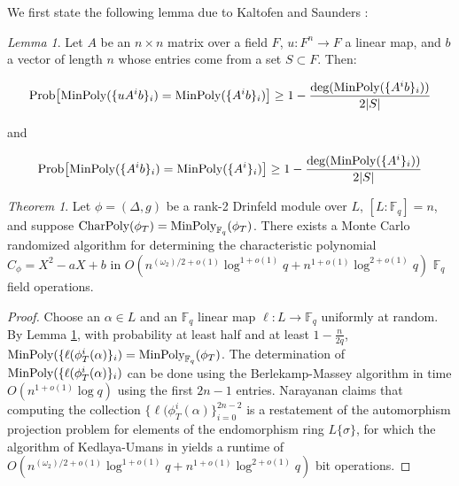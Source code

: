 \documentclass{jams-l}
\theoremstyle{remark}
\numberwithin{equation}{section}
\newtheorem{theorem}{Theorem}
\newtheorem{lemma}{Lemma}
\newcommand{\minpol}{\textnormal{MinPoly}_{\mathbb{F}_q}}
\begin{document}
We first state the following lemma due to Kaltofen and Saunders \cite{Kaltofen-saun:1991:WMS:646027.676885} :

\begin{lemma}\label{kalsaun}
Let $A$ be an $n\times n$ matrix over a field $F$, $u: F^n \to F$ a linear map, and $b$ a vector of length $n$ whose entries come from a set $S \subset F$. Then:

\[ \textnormal{Prob}\big[\textnormal{MinPoly}(\{uA^ib\}_i) = \textnormal{MinPoly}(\{A^ib\}_i)\big] \geq 1 - \frac{\textnormal{deg}(\textnormal{MinPoly}(\{A^ib\}_i))}{2|S|} \]

\noindent and

\[ \textnormal{Prob}\big[\textnormal{MinPoly}(\{A^ib\}_i) = \textnormal{MinPoly}(\{A^i\}_i)\big] \geq 1 - \frac{\textnormal{deg}(\textnormal{MinPoly}(\{A^i\}_i))}{2|S|} \]



\end{lemma}


\begin{theorem}
Let $\phi = (\Delta, g)$ be a rank-2 Drinfeld module over $L$, $[L: \mathbb{F}_q] = n$, and suppose $\textnormal{CharPoly}(\phi_T) = \minpol(\phi_T)$. There exists a Monte Carlo randomized algorithm for determining the characteristic polynomial $C_{\phi} = X^2 -aX + b$ in $O(n^{(\omega_2)/2 + o(1)}\log^{1+o(1)}q + n^{1+o(1)}\log^{2+o(1)}q)$ $\mathbb{F}_q$ field operations.
\end{theorem}

\begin{proof}

Choose an $\alpha \in L$ and an $\mathbb{F}_q$ linear map $\ell: L \to \mathbb{F}_q$ uniformly at random. By Lemma \ref{kalsaun}, with probability at least half and at least $1 - \frac{n}{2q}$, $\textnormal{MinPoly}(\{\ell(\phi_T^i(\alpha)\}_i) = \minpol(\phi_T)$. The determination of $\textnormal{MinPoly}(\{\ell(\phi_T^i(\alpha)\}_i)$ can be done using the Berlekamp-Massey algorithm in time $O(n^{1+ o(1)} \log q)$ using the first $2n - 1$ entries. Narayanan claims that computing the collection $\{ \ell(\phi_T^i(\alpha)\}_{i=0}^{2n-2}$ is a restatement of the automorphism projection problem for elements of the endomorphism ring $L\{\sigma\}$, for which the algorithm of Kedlaya-Umans in \cite{Kedlaya:2011:FPF:2340436.2340448} yields a runtime of $O(n^{(\omega_2)/2 + o(1)}\log^{1+o(1)}q + n^{1+o(1)}\log^{2+o(1)}q)$ bit operations.
\end{proof}
\end{document}
